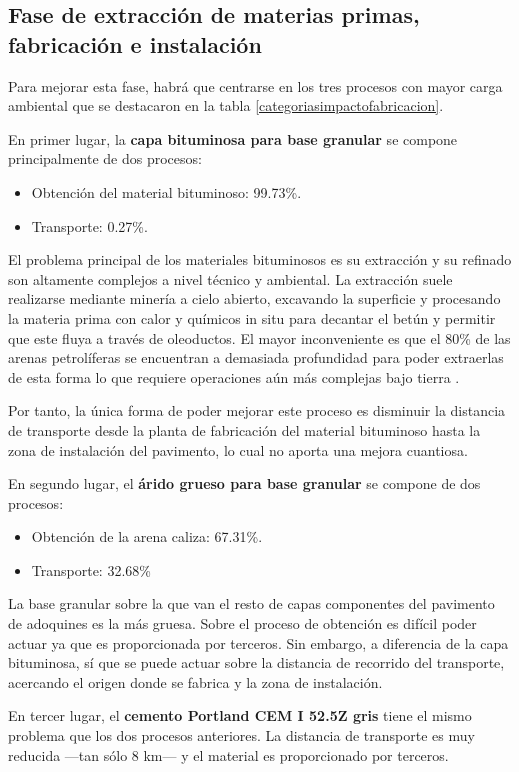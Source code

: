 \subsection{Fase de extracción de materias primas, fabricación e instalación}
Para mejorar esta fase, habrá que centrarse en los tres procesos con mayor carga ambiental que se destacaron en la tabla \ref{categoriasimpactofabricacion}.

En primer lugar, la \textbf{capa bituminosa para base granular} se compone principalmente de dos procesos:
\begin{itemize}
  \item Obtención del material bituminoso: 99.73\%.
  \item Transporte: 0.27\%.
\end{itemize}

El problema principal de los materiales bituminosos es su extracción y su refinado son altamente complejos a nivel técnico y ambiental. La extracción suele realizarse mediante minería a cielo abierto, excavando la superficie y procesando la materia prima con calor y químicos in situ para decantar el betún y permitir que este fluya a través de oleoductos. El mayor inconveniente es que el 80\% de las arenas petrolíferas se encuentran a demasiada profundidad para poder extraerlas de esta forma lo que requiere operaciones aún más complejas bajo tierra \cite{eurobitume}.

Por tanto, la única forma de poder mejorar este proceso es disminuir la distancia de transporte desde la planta de fabricación del material bituminoso hasta la zona de instalación del pavimento, lo cual no aporta una mejora cuantiosa.

En segundo lugar, el \textbf{árido grueso para base granular} se compone de dos procesos:
\begin{itemize}
  \item Obtención de la arena caliza: 67.31\%.
  \item Transporte: 32.68\%
\end{itemize}

La base granular sobre la que van el resto de capas componentes del pavimento de adoquines es la más gruesa. Sobre el proceso de obtención es difícil poder actuar ya que es proporcionada por terceros. Sin embargo, a diferencia de la capa bituminosa, sí que se puede actuar sobre la distancia de recorrido del transporte, acercando el origen donde se fabrica y la zona de instalación.

En tercer lugar, el \textbf{cemento Portland CEM I 52.5Z gris} tiene el mismo problema que los dos procesos anteriores. La distancia de transporte es muy reducida —tan sólo 8 \si{km}— y el material es proporcionado por terceros.

